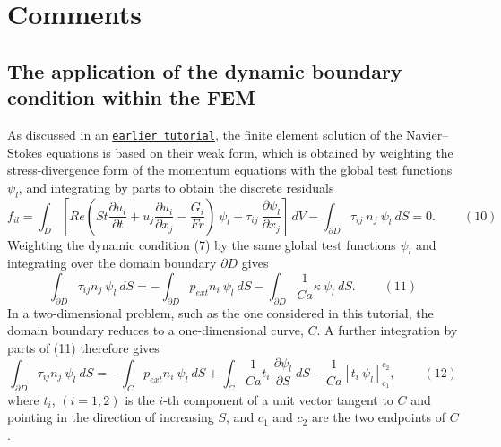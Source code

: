 \hypertarget{index_comments}{}\section{Comments}\label{index_comments}
\hypertarget{index_application_of_dbc}{}\subsection{The application of the dynamic boundary condition within the F\+EM}\label{index_application_of_dbc}
As discussed in an \href{../../rayleigh_traction_channel/html/index.html#traction_theory}{\tt earlier tutorial}, the finite element solution of the Navier--Stokes equations is based on their weak form, which is obtained by weighting the stress-\/divergence form of the momentum equations with the global test functions $ \psi_l $, and integrating by parts to obtain the discrete residuals \[ f_{il} = \int_D \left[ Re\left(St\frac{\partial u_i}{\partial t} + u_j\frac{\partial u_i}{\partial x_j} - \frac{G_i}{Fr}\right) \ \psi_l + \tau_{ij} \ \frac{\partial \psi_l}{\partial x_j} \right] \, dV - \int_{\partial D} \tau_{ij} \ n_j \ \psi_l \ dS = 0. \ \ \ \ \ \ \ \ \ \ (10) \] Weighting the dynamic condition (7) by the same global test functions $ \psi_l $ and integrating over the domain boundary $ \partial D$ gives \[ \int_{\partial D} \tau_{ij} n_j \ \psi_l \ dS = - \int_{\partial D} p_{ext} n_i \ \psi_l \ dS - \int_{\partial D} \frac{1}{Ca} \kappa \ \psi_l \ dS. \ \ \ \ \ \ \ \ \ \ (11) \] In a two-\/dimensional problem, such as the one considered in this tutorial, the domain boundary reduces to a one-\/dimensional curve, $ C $. A further integration by parts of (11) therefore gives \[ \int_{\partial D} \tau_{ij} n_j \ \psi_l \ dS = - \int_C p_{ext} n_i \ \psi_l \ dS + \int_C \frac{1}{Ca} t_i \ \frac{\partial\psi_l}{\partial S} \ dS - \frac{1}{Ca} \left[ t_i \ \psi_l \right]^{c_2}_{c_1}, \ \ \ \ \ \ \ \ \ \ (12) \] where $ t_i $, $ (i=1,2) $ is the $ i $-\/th component of a unit vector tangent to $ C $ and pointing in the direction of increasing $ S $, and $ c_1 $ and $ c_2 $ are the two endpoints of $ C $.

